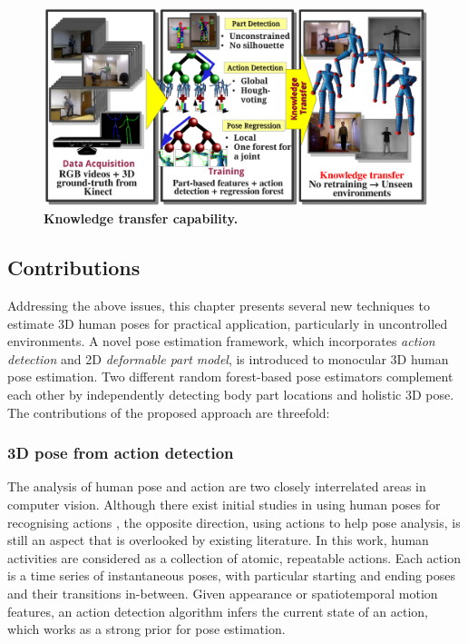\begin{figure}[th]
	\centering
	\includegraphics[width=1\linewidth]{fig/body/figure2_transferexplain.pdf}
	\caption{\textbf{Knowledge transfer capability.}} 
	\label{fig/body/transferexplain}
\end{figure}



\subsection{Contributions}

Addressing the above issues, this chapter presents several new techniques to estimate 3D human poses for practical application, particularly in uncontrolled environments. 
A novel pose estimation framework, which incorporates \emph{action detection} and 2D \emph{deformable part model}, is introduced to monocular 3D human pose estimation. 
Two different random forest-based pose estimators complement each other by independently detecting body part locations and holistic 3D pose. The contributions of the proposed approach are threefold:  

\subsubsection{3D pose from action detection} 

The analysis of human pose and action are two closely interrelated areas in computer vision. Although there exist initial studies in using human poses for recognising actions \cite{Yao2012, Wang2012}, the opposite direction, \ie using actions to help pose analysis, 
is still an aspect that is overlooked by existing literature. 
In this work, human activities are considered as a collection of atomic, repeatable actions. 
Each action is a time series of instantaneous poses, with particular starting and ending poses and their transitions in-between. Given appearance or spatiotemporal motion features, an action detection algorithm infers the current state of an action, which works as a strong prior for pose estimation.   

